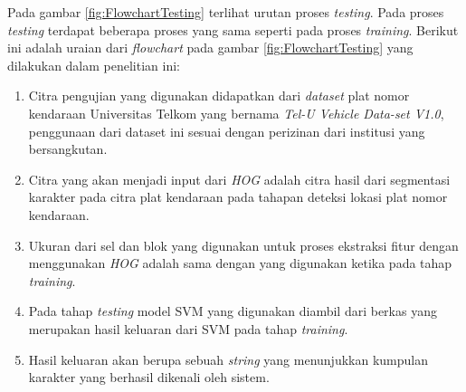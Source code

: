 \noindent Pada gambar \ref{fig:FlowchartTesting} terlihat urutan proses \textit{testing}. Pada proses \textit{testing} terdapat beberapa proses yang sama seperti pada proses \textit{training}. Berikut ini adalah uraian dari \textit{flowchart} pada gambar \ref{fig:FlowchartTesting} yang dilakukan dalam penelitian ini:
\begin{enumerate}
\item Citra pengujian yang digunakan didapatkan dari \textit{dataset} plat nomor kendaraan Universitas Telkom yang bernama \textit{Tel-U Vehicle Data-set V1.0}, penggunaan dari dataset ini sesuai dengan perizinan dari institusi yang bersangkutan.
\item Citra yang akan menjadi input dari \textit{HOG} adalah citra hasil dari segmentasi karakter pada citra plat kendaraan pada tahapan deteksi lokasi plat nomor kendaraan.
\item Ukuran dari sel dan blok yang digunakan untuk proses ekstraksi fitur dengan menggunakan \textit{HOG} adalah sama dengan yang digunakan ketika pada tahap \textit{training}.
\item Pada tahap \textit{testing} model SVM yang digunakan diambil dari berkas yang merupakan hasil keluaran dari SVM pada tahap \textit{training}.
\item Hasil keluaran akan berupa sebuah \textit{string} yang menunjukkan kumpulan karakter yang berhasil dikenali oleh sistem.\\
\end{enumerate}



